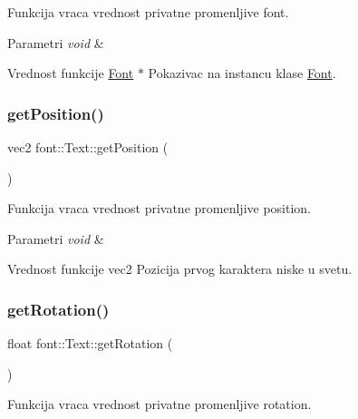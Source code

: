 Funkcija vraca vrednost privatne promenljive font. 


\begin{DoxyParams}{Parametri}
{\em void} & \\
\hline
\end{DoxyParams}
\begin{DoxyReturn}{Vrednost funkcije}
\hyperlink{classfont_1_1Font}{Font} $\ast$ Pokazivac na instancu klase \hyperlink{classfont_1_1Font}{Font}. 
\end{DoxyReturn}
\mbox{\label{classfont_1_1Text_a6d9c2d80d02c59ce0811190ba0ee5cb8}} 
\subsubsection{\texorpdfstring{get\+Position()}{getPosition()}}
{\footnotesize\ttfamily vec2 font\+::\+Text\+::get\+Position (\begin{DoxyParamCaption}{ }\end{DoxyParamCaption})}



Funkcija vraca vrednost privatne promenljive position. 


\begin{DoxyParams}{Parametri}
{\em void} & \\
\hline
\end{DoxyParams}
\begin{DoxyReturn}{Vrednost funkcije}
vec2 Pozicija prvog karaktera niske u svetu. 
\end{DoxyReturn}
\mbox{\label{classfont_1_1Text_a5e59176805cd037ae0c528b84703961c}} 
\subsubsection{\texorpdfstring{get\+Rotation()}{getRotation()}}
{\footnotesize\ttfamily float font\+::\+Text\+::get\+Rotation (\begin{DoxyParamCaption}{ }\end{DoxyParamCaption})}



Funkcija vraca vrednost privatne promenljive rotation. 


